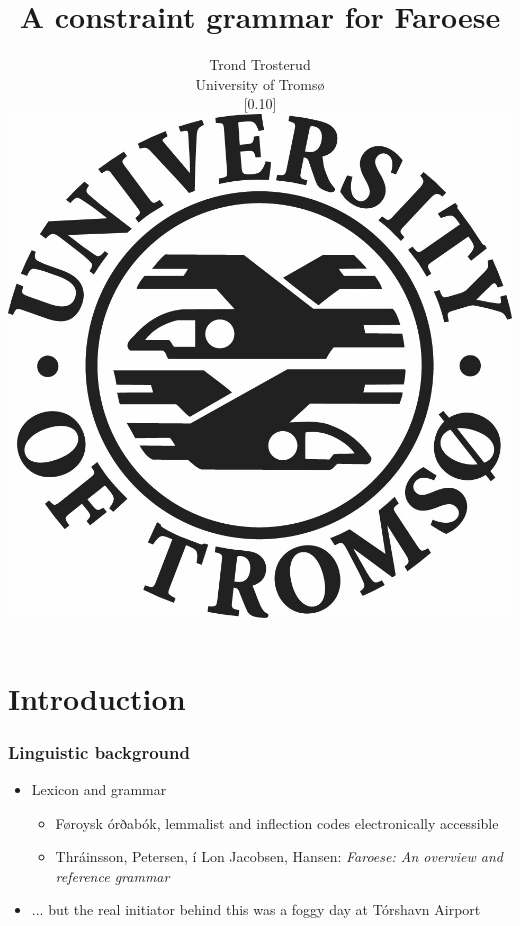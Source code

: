 \documentclass{beamer}
\begin{document}
\title{A constraint grammar for Faroese}
\author{Trond Trosterud \\ 
University of Tromsø \begin{figure}  \scalebox{0.10}[0.10]{\includegraphics{img/LogoEngelsk}} \end{figure} 
}

\date

\frame{\titlepage} 


\section{Introduction} 


\begin{frame}
\frametitle{Linguistic background}
\begin{itemize}
\item Lexicon and grammar
\begin{itemize}
\item Føroysk órðabók, lemmalist and inflection codes electronically accessible
\item Thráinsson, Petersen, í Lon Jacobsen, Hansen: \textit{Faroese: An overview and reference grammar} \\ \pause
\end{itemize}
\item ... but the real initiator behind this was a foggy day at Tórshavn Airport
\end{itemize}
\end{frame}
\end{document}
